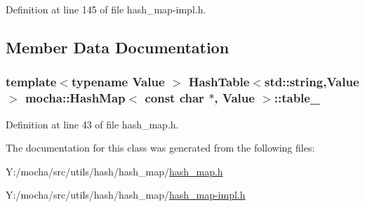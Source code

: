 Definition at line 145 of file hash\_\-map-\/impl.h.



\subsection{Member Data Documentation}
\hypertarget{classmocha_1_1_hash_map_3_01const_01char_01_5_00_01_value_01_4_a8d8a5d3b64971ad73706c746afffccf0}{
\subsubsection[{table\_\-}]{\setlength{\rightskip}{0pt plus 5cm}template$<$typename Value $>$ {\bf HashTable}$<$std::string,Value$>$ {\bf mocha::HashMap}$<$ const char $\ast$, Value $>$::{\bf table\_\-}}}
\label{classmocha_1_1_hash_map_3_01const_01char_01_5_00_01_value_01_4_a8d8a5d3b64971ad73706c746afffccf0}


Definition at line 43 of file hash\_\-map.h.



The documentation for this class was generated from the following files:\begin{DoxyCompactItemize}
\item 
Y:/mocha/src/utils/hash/hash\_\-map/\hyperlink{hash__map_8h}{hash\_\-map.h}\item 
Y:/mocha/src/utils/hash/hash\_\-map/\hyperlink{hash__map-impl_8h}{hash\_\-map-\/impl.h}\end{DoxyCompactItemize}
